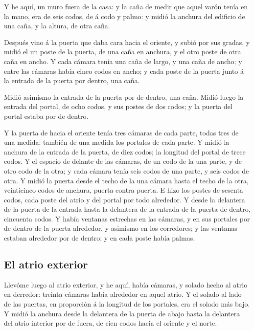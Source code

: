  Y he aquí, un muro fuera de la casa: y la caña de medir que
aquel varón tenía en la mano, era de seis codos, de á codo y palmo: y
midió la anchura del edificio de una caña, y la altura, de otra caña.

 Después vino á la puerta que daba cara hacia el oriente, y
subió por sus gradas, y midió el un poste de la puerta, de una caña en
anchura, y el otro poste de otra caña en ancho.  Y cada
cámara tenía una caña de largo, y una caña de ancho; y entre las cámaras
había cinco codos en ancho; y cada poste de la puerta junto á la entrada
de la puerta por dentro, una caña.

 Midió asimismo la entrada de la puerta por de dentro, una
caña.  Midió luego la entrada del portal, de ocho codos, y
sus postes de dos codos; y la puerta del portal estaba por de dentro.

 Y la puerta de hacia el oriente tenía tres cámaras de cada
parte, todas tres de una medida: también de una medida los portales de
cada parte.  Y midió la anchura de la entrada de la puerta,
de diez codos; la longitud del portal de trece codos.  Y el
espacio de delante de las cámaras, de un codo de la una parte, y de otro
codo de la otra; y cada cámara tenía seis codos de una parte, y seis
codos de otra.  Y midió la puerta desde el techo de la una
cámara hasta el techo de la otra, veinticinco codos de anchura, puerta
contra puerta.  E hizo los postes de sesenta codos, cada
poste del atrio y del portal por todo alrededor.  Y desde
la delantera de la puerta de la entrada hasta la delantera de la entrada
de la puerta de dentro, cincuenta codos.  Y había ventanas
estrechas en las cámaras, y en sus portales por de dentro de la puerta
alrededor, y asimismo en los corredores; y las ventanas estaban
alrededor por de dentro; y en cada poste había palmas.

\hypertarget{el-atrio-exterior}{%
\subsection{El atrio exterior}\label{el-atrio-exterior}}

 Llevóme luego al atrio exterior, y he aquí, había cámaras,
y solado hecho al atrio en derredor: treinta cámaras había alrededor en
aquel atrio.  Y el solado al lado de las puertas, en
proporción á la longitud de los portales, era el solado más bajo.
 Y midió la anchura desde la delantera de la puerta de
abajo hasta la delantera del atrio interior por de fuera, de cien codos
hacia el oriente y el norte.

